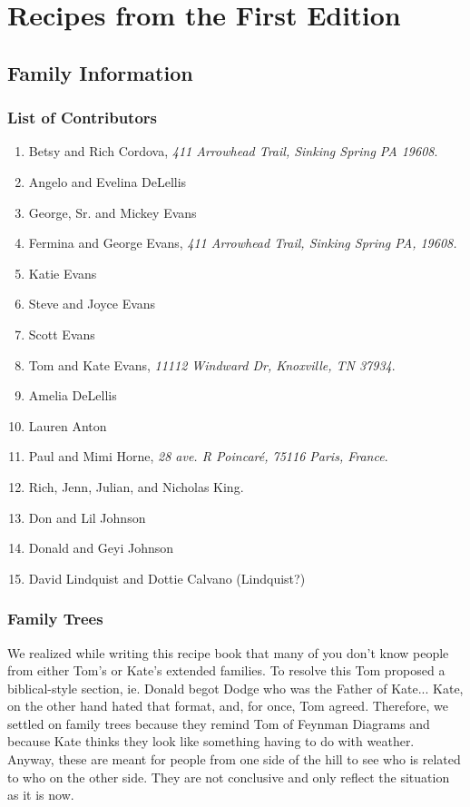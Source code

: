 \documentclass[12pt]{book}
\begin{document}
\part{Recipes from the First Edition}






\appendix
\chapter{Family Information}

\section{List of Contributors}

\begin{enumerate}
 \color{red}
 \itemsep0pt
 \parskip1pt
\item Betsy and Rich Cordova, \textit{411 Arrowhead Trail, Sinking Spring
PA  19608}.
\item Angelo and Evelina DeLellis
\item George, Sr. and Mickey Evans
\item Fermina and George Evans, \textit{411 Arrowhead Trail,
Sinking Spring PA, 19608.}
\item Katie Evans
\item Steve and Joyce Evans
\item Scott Evans
\item Tom and Kate Evans, \textit{11112 Windward Dr, Knoxville, TN 37934}.
\item Amelia DeLellis
\item Lauren Anton
\item Paul and Mimi Horne, \textit{28 ave. R Poincar\'{e}, 75116
Paris, France}.
\item Rich, Jenn, Julian, and Nicholas King.
\item Don and Lil Johnson
\item Donald and Geyi Johnson
\item David Lindquist and Dottie Calvano (Lindquist?)
\end{enumerate}

\section{Family Trees}

{\color{red}
We realized while writing this recipe book that many of you don't know
people from either Tom's or Kate's extended families.  To resolve this
Tom proposed a biblical-style section, ie. Donald begot Dodge who was the
Father of Kate...  Kate, on the other hand hated that format, and, for
once, Tom agreed.  Therefore, we settled on family trees because they
remind Tom of Feynman Diagrams and because Kate thinks they look like
something having to do with weather.  Anyway, these are meant for people
from one side of the hill to see who is related to who on the other side.
They are not conclusive and only reflect the situation as it is now.
}
\end{document}
